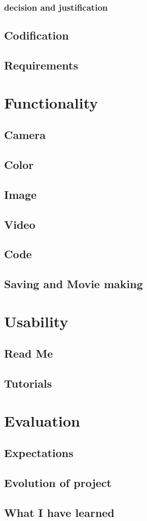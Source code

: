 \documentclass[a4paper]{report}
\begin{document}
\subsection{decision and justification}
\section{Codification}
\section{Requirements}

\chapter{Functionality}
\section{Camera}
\section{Color}
\section{Image}
\section{Video}
\section{Code}
\section{Saving and Movie making}

\chapter{Usability}
\section{Read Me}
\section{Tutorials}

\chapter{Evaluation}
\section{Expectations}
\section{Evolution of project}
\section{What I have learned}




\end{document}
